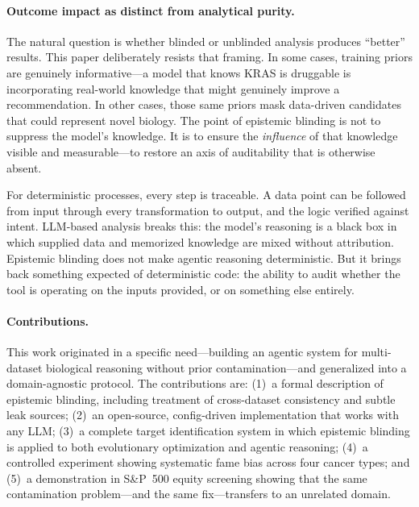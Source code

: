 \documentclass[sigconf, nonacm]{acmart}
\begin{document}
\paragraph{Outcome impact as distinct from analytical purity.} The natural question is whether blinded or unblinded analysis produces ``better'' results. This paper deliberately resists that framing. In some cases, training priors are genuinely informative---a model that knows KRAS is druggable is incorporating real-world knowledge that might genuinely improve a recommendation. In other cases, those same priors mask data-driven candidates that could represent novel biology. The point of epistemic blinding is not to suppress the model's knowledge. It is to ensure the \textit{influence} of that knowledge visible and measurable---to restore an axis of auditability that is otherwise absent.

For deterministic processes, every step is traceable. A data point can be followed from input through every transformation to output, and the logic verified against intent. LLM-based analysis breaks this: the model's reasoning is a black box in which supplied data and memorized knowledge are mixed without attribution. Epistemic blinding does not make agentic reasoning deterministic. But it brings back something expected of deterministic code: the ability to audit whether the tool is operating on the inputs provided, or on something else entirely.

\paragraph{Contributions.} This work originated in a specific need---building an agentic system for multi-dataset biological reasoning without prior contamination---and generalized into a domain-agnostic protocol. The contributions are: (1)~a formal description of epistemic blinding, including treatment of cross-dataset consistency and subtle leak sources; (2)~an open-source, config-driven implementation that works with any LLM; (3)~a complete target identification system in which epistemic blinding is applied to both evolutionary optimization and agentic reasoning; (4)~a controlled experiment showing systematic fame bias across four cancer types; and (5)~a demonstration in S\&P~500 equity screening showing that the same contamination problem---and the same fix---transfers to an unrelated domain.

\end{document}
